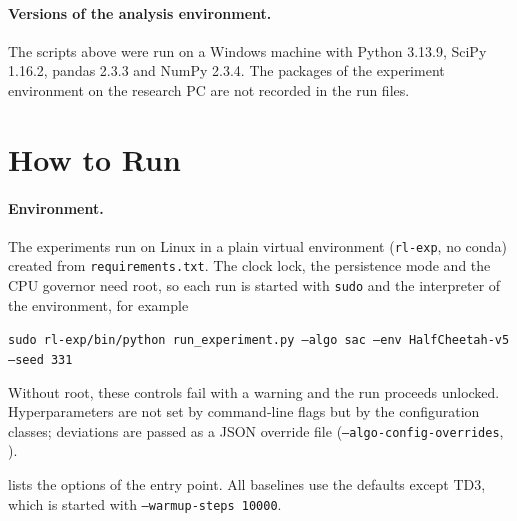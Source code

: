 \paragraph{Versions of the analysis environment.} The scripts above were run on a Windows machine with Python 3.13.9, SciPy 1.16.2, pandas 2.3.3 and NumPy 2.3.4.
The packages of the experiment environment on the research PC are not recorded in the run files.

\section{How to Run}\label{sec:app-repro-run}

\paragraph{Environment.} The experiments run on Linux in a plain virtual environment (\texttt{rl-exp}, no conda) created from \texttt{requirements.txt}.
The clock lock, the persistence mode and the CPU governor need root, so each run is started with \texttt{sudo} and the interpreter of the environment, for example
\begin{center}
  \texttt{sudo rl-exp/\allowbreak bin/\allowbreak python run\_\allowbreak experiment.py --algo sac --env HalfCheetah-v5 --seed 331}
\end{center}
Without root, these controls fail with a warning and the run proceeds unlocked.
Hyperparameters are not set by command-line flags but by the configuration classes; deviations are passed as a JSON override file (\texttt{--algo-config-overrides}, ).

 lists the options of the entry point.
All baselines use the defaults except TD3, which is started with \texttt{--warmup-steps 10000}.

